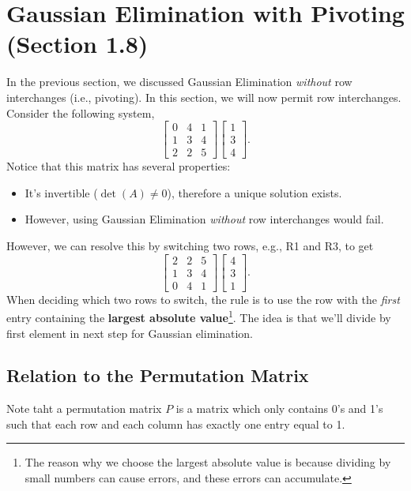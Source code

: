 \documentclass[letterpaper]{article}
\newcommand{\0}{\mathbf{0}}
\begin{document}
\section{Gaussian Elimination with Pivoting (Section 1.8)}
In the previous section, we discussed Gaussian Elimination \emph{without} row interchanges (i.e., pivoting). In this section, we will now permit row interchanges. Consider the following system, 
\[\begin{bmatrix}
    0 & 4 & 1 \\ 
    1 & 3 & 4 \\ 
    2 & 2 & 5
\end{bmatrix} \begin{bmatrix}
    1 \\ 3 \\ 4
\end{bmatrix}.\]
Notice that this matrix has several properties: 
\begin{itemize}
    \item It's invertible ($\det(A) \neq 0$), therefore a unique solution exists. 
    \item However, using Gaussian Elimination \emph{without} row interchanges would fail. 
\end{itemize}
However, we can resolve this by switching two rows, e.g., R1 and R3, to get 
\[\begin{bmatrix}
    2 & 2 & 5 \\ 
    1 & 3 & 4 \\ 
    0 & 4 & 1
\end{bmatrix} \begin{bmatrix}
    4 \\ 3 \\ 1
\end{bmatrix}.\]
When deciding which two rows to switch, the rule is to use the row with the \emph{first} entry containing the \textbf{largest absolute value}\footnote{The reason why we choose the largest absolute value is because dividing by small numbers can cause errors, and these errors can accumulate.}. The idea is that we'll divide by first element in next step for Gaussian elimination.

\subsection{Relation to the Permutation Matrix}
Note taht a permutation matrix $P$ is a matrix which only contains 0's and 1's such that each row and each column has exactly one entry equal to 1. 
\end{document}
